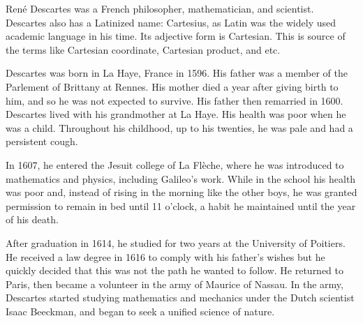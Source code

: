 \documentclass[b5paper]{article}
\begin{document}
\begin{mdframed}
René Descartes was a French philosopher, mathematician, and scientist. Descartes also has a Latinized name: Cartesius, as Latin was the widely used academic language in his time. Its adjective form is Cartesian. This is source of the terms like Cartesian coordinate, Cartesian product, and etc.

Descartes was born in La Haye, France in 1596. His father was a member of the Parlement of Brittany at Rennes. His mother died a year after giving birth to him, and so he was not expected to survive. His father then remarried in 1600. Descartes lived with his grandmother at La Haye. His health was poor when he was a child. Throughout his childhood, up to his twenties, he was pale and had a persistent cough.

In 1607, he entered the Jesuit college of La Flèche, where he was introduced to mathematics and physics, including Galileo's work. While in the school his health was poor and, instead of rising in the morning like the other boys, he was granted permission to remain in bed until 11 o'clock, a habit he maintained until the year of his death.

After graduation in 1614, he studied for two years at the University of Poitiers. He received a law degree in 1616 to comply with his father's wishes but he quickly decided that this was not the path he wanted to follow. He returned to Paris, then became a volunteer in the army of Maurice of Nassau. In the army, Descartes started studying mathematics and mechanics under the Dutch scientist Isaac Beeckman, and began to seek a unified science of nature.



\end{mdframed}
\end{document}
